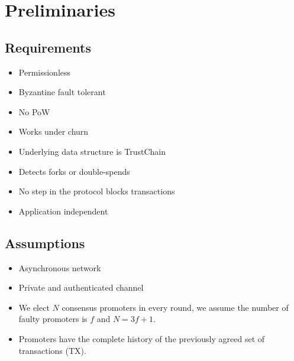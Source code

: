 \section{Preliminaries}

\subsection{Requirements}
\begin{itemize}
\item Permissionless
\item Byzantine fault tolerant
\item No PoW
\item Works under churn
\item Underlying data structure is TrustChain
\item Detects forks or double-spends
\item No step in the protocol blocks transactions
\item Application independent
\end{itemize}

\subsection{Assumptions}
\begin{itemize}
\item Asynchronous network
\item Private and authenticated channel
\item We elect $N$ consensus promoters in every round, we assume the number of
  faulty promoters is $f$ and $N = 3f + 1$.
\item Promoters have the complete history of the previously agreed set of
  transactions (TX).
\end{itemize}

